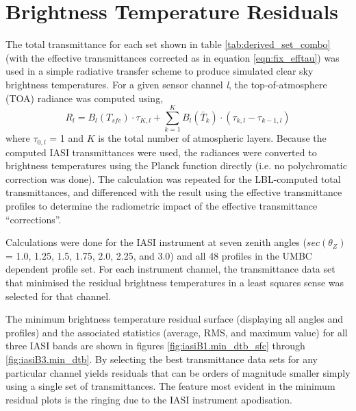 \section{Brightness Temperature Residuals}
\label{sec:tb_residuals}
The total transmittance for each set shown in table \ref{tab:derived_set_combo} (with the effective transmittances corrected as in equation \ref{eqn:fix_efftau}) was used in a simple radiative transfer scheme to produce simulated clear sky brightness temperatures. For a given sensor channel \emph{l}, the top-of-atmosphere (TOA) radiance was computed using,
\begin{equation}
  R_{l} = B_{l}(T_{sfc})\cdot\tau_{K,l} + \sum_{k=1}^{K}B_{l}(\bar{T}_{k})\cdot(\tau_{k,l}-\tau_{k-1,l})
\end{equation}
where $\tau_{0,l}$ = 1 and $K$ is the total number of atmospheric layers. Because the computed IASI transmittances were used, the radiances were converted to brightness temperatures using the Planck function directly (i.e. no polychromatic correction was done). The calculation was repeated for the LBL-computed total transmittances, and differenced with the result using the effective transmittance profiles to determine the radiometric impact of the effective transmittance ``corrections''.

Calculations were done for the IASI instrument at seven zenith angles ($sec(\theta_{Z})$ = 1.0, 1.25, 1.5, 1.75, 2.0, 2.25, and 3.0) and all 48 profiles in the UMBC dependent profile set. For each instrument channel, the transmittance data set that minimised the residual brightness temperatures in a least squares sense was selected for that channel.

The minimum brightness temperature residual surface (displaying all angles and profiles) and the associated statistics (average, RMS, and maximum value) for all three IASI bands are shown in figures \ref{fig:iasiB1.min_dtb_sfc} through \ref{fig:iasiB3.min_dtb}. By selecting the best  transmittance data sets for any particular channel yields residuals that can be orders of magnitude smaller simply using a single set of transmittances. The feature most evident in the minimum residual plots is the ringing due to the IASI instrument apodisation.

